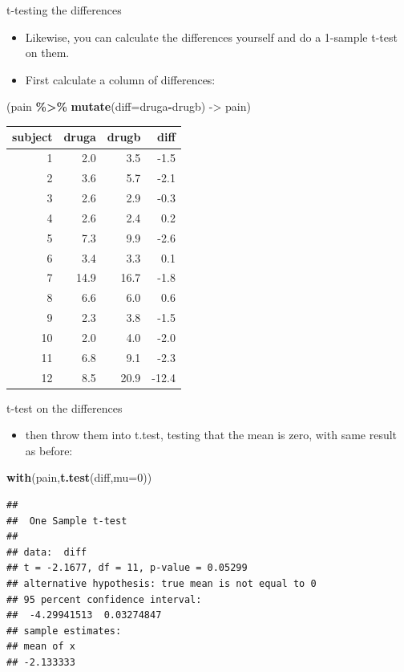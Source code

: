 \documentclass[
  ignorenonframetext,
]{beamer}
\newenvironment{Shaded}{\begin{snugshade}}{\end{snugshade}}
\newcommand{\DataTypeTok}[1]{\textcolor[rgb]{0.13,0.29,0.53}{#1}}
\newcommand{\DecValTok}[1]{\textcolor[rgb]{0.00,0.00,0.81}{#1}}
\newcommand{\KeywordTok}[1]{\textcolor[rgb]{0.13,0.29,0.53}{\textbf{#1}}}
\newcommand{\NormalTok}[1]{#1}
\newcommand{\OperatorTok}[1]{\textcolor[rgb]{0.81,0.36,0.00}{\textbf{#1}}}
\newcommand{\StringTok}[1]{\textcolor[rgb]{0.31,0.60,0.02}{#1}}
\providecommand{\tightlist}{%
  \setlength{\itemsep}{0pt}\setlength{\parskip}{0pt}}
\begin{document}
\begin{frame}[fragile]{t-testing the differences}
\protect\hypertarget{t-testing-the-differences}{}
\begin{itemize}
\tightlist
\item
  Likewise, you can calculate the differences yourself and do a 1-sample
  t-test on them.
\item
  First calculate a column of differences:
\end{itemize}

\footnotesize

\begin{Shaded}
\begin{Highlighting}[]
\NormalTok{(pain }\OperatorTok{\%\textgreater{}\%}\StringTok{ }\KeywordTok{mutate}\NormalTok{(}\DataTypeTok{diff=}\NormalTok{druga}\OperatorTok{{-}}\NormalTok{drugb) {-}\textgreater{}}\StringTok{ }\NormalTok{pain)}
\end{Highlighting}
\end{Shaded}

\begin{longtable}[]{@{}rrrr@{}}
\toprule
subject & druga & drugb & diff\tabularnewline
\midrule
\endhead
1 & 2.0 & 3.5 & -1.5\tabularnewline
2 & 3.6 & 5.7 & -2.1\tabularnewline
3 & 2.6 & 2.9 & -0.3\tabularnewline
4 & 2.6 & 2.4 & 0.2\tabularnewline
5 & 7.3 & 9.9 & -2.6\tabularnewline
6 & 3.4 & 3.3 & 0.1\tabularnewline
7 & 14.9 & 16.7 & -1.8\tabularnewline
8 & 6.6 & 6.0 & 0.6\tabularnewline
9 & 2.3 & 3.8 & -1.5\tabularnewline
10 & 2.0 & 4.0 & -2.0\tabularnewline
11 & 6.8 & 9.1 & -2.3\tabularnewline
12 & 8.5 & 20.9 & -12.4\tabularnewline
\bottomrule
\end{longtable}

\normalsize
\end{frame}

\begin{frame}[fragile]{t-test on the differences}
\protect\hypertarget{t-test-on-the-differences}{}
\begin{itemize}
\tightlist
\item
  then throw them into t.test, testing that the mean is zero, with same
  result as before:
\end{itemize}

\begin{Shaded}
\begin{Highlighting}[]
\KeywordTok{with}\NormalTok{(pain,}\KeywordTok{t.test}\NormalTok{(diff,}\DataTypeTok{mu=}\DecValTok{0}\NormalTok{))}
\end{Highlighting}
\end{Shaded}

\begin{verbatim}
## 
##  One Sample t-test
## 
## data:  diff
## t = -2.1677, df = 11, p-value = 0.05299
## alternative hypothesis: true mean is not equal to 0
## 95 percent confidence interval:
##  -4.29941513  0.03274847
## sample estimates:
## mean of x 
## -2.133333
\end{verbatim}
\end{frame}
\end{document}
